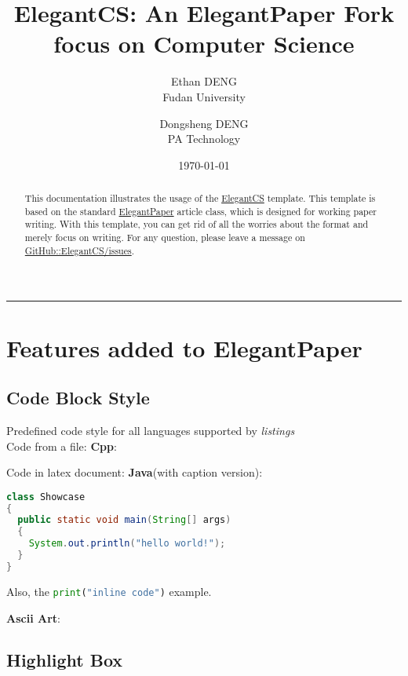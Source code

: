 \documentclass[lang=cn,a4paper,bibend=bibtex]{elegantcs}
\title{ElegantCS: An ElegantPaper Fork focus on Computer Science}
\author{Ethan DENG \\ Fudan University \and Dongsheng DENG \\ PA Technology}
\institute{\href{https://github.com/ElegantLaTeX}{Elegant\LaTeX{} Program}}
\date{\today}
\begin{document}
\maketitle

\begin{abstract}
This documentation illustrates the usage of the \href{https://github.com/Ziqi-Yang/ElegantCS}{ElegantCS} template. This template is based on the standard \href{https://github.com/ElegantLaTeX/ElegantPaper}{ElegantPaper} article class, which is designed for working paper writing. With this template, you can get rid of all the worries about the format and merely focus on writing. For any question, please leave a message on \href{https://github.com/Ziqi-Yang/ElegantCS/issues}{GitHub::ElegantCS/issues}.\par
{}
\end{abstract}


\noindent\rule{\textwidth}{1pt}

\section*{Features added to ElegantPaper}

\subsection*{Code Block Style}

Predefined code style for all languages supported by \textit{listings}\\
Code from a file:
\textbf{Cpp}:


Code in latex document:
\textbf{Java}(with caption version):
\begin{lstlisting}[language=Java, caption={Showcase.java}]
class Showcase
{
  public static void main(String[] args)
  {
    System.out.println("hello world!");
  }
}
\end{lstlisting}

Also, the \lstinline[language=Python]|print("inline code")| example.

\textbf{Ascii Art}:
\setmonofont{Quivira}



\subsection*{Highlight Box}
\end{document}
